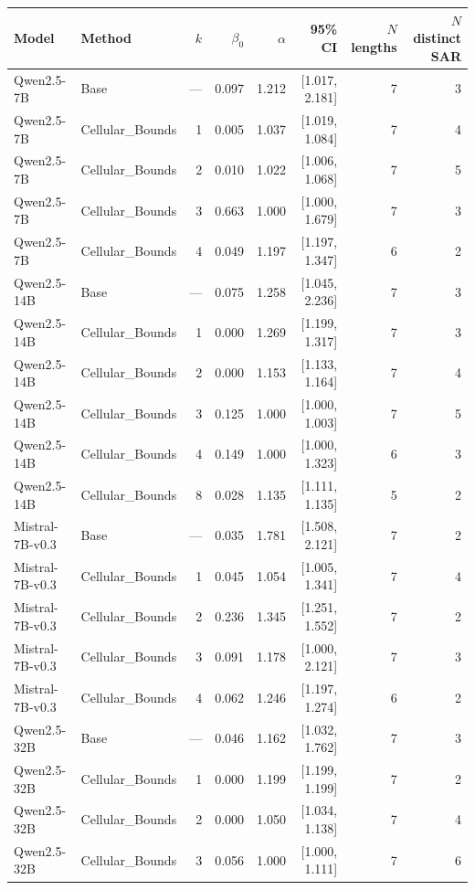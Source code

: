 \documentclass[11pt]{article}
\begin{document}
\begin{table}[htbp]
\centering
\small
\begin{tabular}{llrrrrrr}
\toprule
Model & Method & $k$ & $\beta_0$ & $\alpha$ & 95\% CI & $N$ lengths & $N$ distinct SAR \\
\midrule
Qwen2.5-7B & Base & --- & 0.097 & 1.212 & [1.017, 2.181] & 7 & 3 \\
Qwen2.5-7B & Cellular\_Bounds & 1 & 0.005 & 1.037 & [1.019, 1.084] & 7 & 4 \\
Qwen2.5-7B & Cellular\_Bounds & 2 & 0.010 & 1.022 & [1.006, 1.068] & 7 & 5 \\
Qwen2.5-7B & Cellular\_Bounds & 3 & 0.663 & 1.000 & [1.000, 1.679] & 7 & 3 \\
Qwen2.5-7B & Cellular\_Bounds & 4 & 0.049 & 1.197 & [1.197, 1.347] & 6 & 2 \\
\addlinespace
Qwen2.5-14B & Base & --- & 0.075 & 1.258 & [1.045, 2.236] & 7 & 3 \\
Qwen2.5-14B & Cellular\_Bounds & 1 & 0.000 & 1.269 & [1.199, 1.317] & 7 & 3 \\
Qwen2.5-14B & Cellular\_Bounds & 2 & 0.000 & 1.153 & [1.133, 1.164] & 7 & 4 \\
Qwen2.5-14B & Cellular\_Bounds & 3 & 0.125 & 1.000 & [1.000, 1.003] & 7 & 5 \\
Qwen2.5-14B & Cellular\_Bounds & 4 & 0.149 & 1.000 & [1.000, 1.323] & 6 & 3 \\
Qwen2.5-14B & Cellular\_Bounds & 8 & 0.028 & 1.135 & [1.111, 1.135] & 5 & 2 \\
\addlinespace
Mistral-7B-v0.3 & Base & --- & 0.035 & 1.781 & [1.508, 2.121] & 7 & 2 \\
Mistral-7B-v0.3 & Cellular\_Bounds & 1 & 0.045 & 1.054 & [1.005, 1.341] & 7 & 4 \\
Mistral-7B-v0.3 & Cellular\_Bounds & 2 & 0.236 & 1.345 & [1.251, 1.552] & 7 & 2 \\
Mistral-7B-v0.3 & Cellular\_Bounds & 3 & 0.091 & 1.178 & [1.000, 2.121] & 7 & 3 \\
Mistral-7B-v0.3 & Cellular\_Bounds & 4 & 0.062 & 1.246 & [1.197, 1.274] & 6 & 2 \\
\addlinespace
Qwen2.5-32B & Base & --- & 0.046 & 1.162 & [1.032, 1.762] & 7 & 3 \\
Qwen2.5-32B & Cellular\_Bounds & 1 & 0.000 & 1.199 & [1.199, 1.199] & 7 & 2 \\
Qwen2.5-32B & Cellular\_Bounds & 2 & 0.000 & 1.050 & [1.034, 1.138] & 7 & 4 \\
Qwen2.5-32B & Cellular\_Bounds & 3 & 0.056 & 1.000 & [1.000, 1.111] & 7 & 6 \\

\end{tabular}
\end{table}
\end{document}

